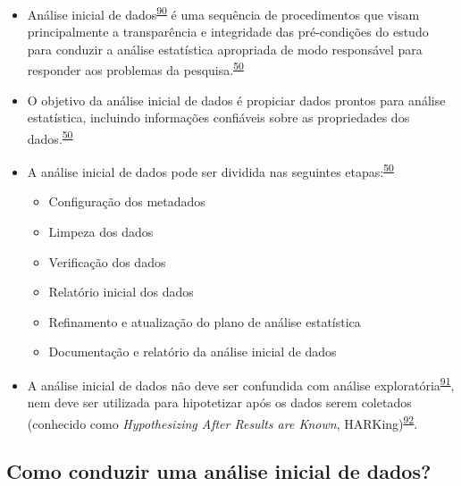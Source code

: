 \documentclass[
  a4paper,
]{book}
\begin{document}
\begin{itemize}
\item
  Análise inicial de dados\textsuperscript{\protect\hyperlink{ref-chatfield1986}{90}} é uma sequência de procedimentos que visam principalmente a transparência e integridade das pré-condições do estudo para conduzir a análise estatística apropriada de modo responsável para responder aos problemas da pesquisa.\textsuperscript{\protect\hyperlink{ref-Baillie2022}{50}}
\item
  O objetivo da análise inicial de dados é propiciar dados prontos para análise estatística, incluindo informações confiáveis sobre as propriedades dos dados.\textsuperscript{\protect\hyperlink{ref-Baillie2022}{50}}
\item
  A análise inicial de dados pode ser dividida nas seguintes etapas:\textsuperscript{\protect\hyperlink{ref-Baillie2022}{50}}

  \begin{itemize}
  \item
    Configuração dos metadados
  \item
    Limpeza dos dados
  \item
    Verificação dos dados
  \item
    Relatório inicial dos dados
  \item
    Refinamento e atualização do plano de análise estatística
  \item
    Documentação e relatório da análise inicial de dados
  \end{itemize}
\item
  A análise inicial de dados não deve ser confundida com análise exploratória\textsuperscript{\protect\hyperlink{ref-Ferketich1986}{91}}, nem deve ser utilizada para hipotetizar após os dados serem coletados (conhecido como \emph{Hypothesizing After Results are Known}, HARKing)\textsuperscript{\protect\hyperlink{ref-Kerr1998}{92}}.
\end{itemize}

\hypertarget{como-conduzir-uma-anuxe1lise-inicial-de-dados}{%
\subsection{Como conduzir uma análise inicial de dados?}\label{como-conduzir-uma-anuxe1lise-inicial-de-dados}}
\end{document}
